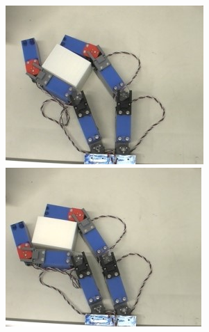 \documentclass[a4paper,twoside,12pt,papersize, dvipdfmx]{iirthesis}
\begin{document}
\begin{figure}[b]
\begin{minipage}{0.24\hsize}
\subcaption{}
\end{minipage}\hfill
\begin{minipage}{0.24\hsize}
\centering
\includegraphics[width=\hsize]{fig/1-introduction/komiyama/mani3.jpg}
\subcaption{}
\end{minipage}\hfill
\begin{minipage}{0.24\hsize}
\centering
\includegraphics[width=\hsize]{fig/1-introduction/komiyama/mani4.jpg}
\subcaption{}
\end{minipage}


\end{figure}
\end{document}
